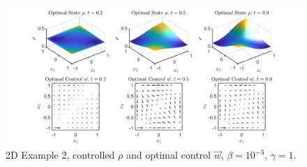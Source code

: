 \documentclass[11pt, a4paper]{article}
\theoremstyle{definition}
\begin{document}
\begin{figure}[h]
	\includegraphics[scale=0.3]{Res2Ex2a.png}
	\caption{2D Example 2, controlled $\rho$ and optimal control $\vec{w}$, $\beta = 10^{-3}$, $\gamma = 1$.}
	\label{rhoOpt2dEx2a}
\end{figure}
	
\end{document}
